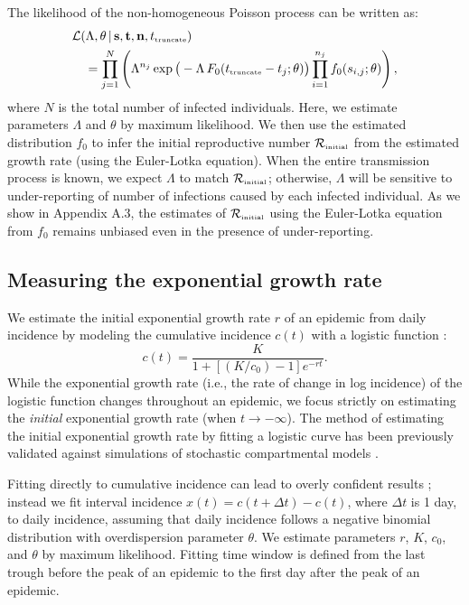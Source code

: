 \documentclass[12pt]{article}
\newcommand{\Rx}[1]{\ensuremath{{\mathcal R}_{#1}}\xspace}
\newcommand{\Rini}{\Rx{\textrm{\tiny initial}}}
\newcommand{\tsub}[2]{#1_{{\textrm{\tiny #2}}}}
\begin{document}
The likelihood of the non-homogeneous Poisson process can be written as:
\begin{equation}\label{eq:nonhomogeneous}
\begin{aligned}
&\mathcal{L}(\Lambda, \theta\,|\, \mathbf{s}, \mathbf{t}, \mathbf{n}, \tsub{t}{truncate})\\
&\quad=\prod_{j=1}^N \left(\Lambda^{n_j} \exp \big(- \Lambda \, F_0(\tsub{t}{truncate} - t_j ;\theta) \big) \prod_{i=1}^{n_j} f_0(s_{i, j}; \theta) \right),
\end{aligned}
\end{equation}
where $N$ is the total number of infected individuals.
Here, we estimate parameters $\Lambda$ and $\theta$ by maximum likelihood.
We then use the estimated distribution $f_0$ to infer the initial reproductive number $\Rini$ from the estimated growth rate (using the Euler-Lotka equation).
When the entire transmission process is known, we expect $\Lambda$ to match $\Rini$;
otherwise, $\Lambda$ will be sensitive to under-reporting of number of infections caused by each infected individual.
As we show in Appendix A.3, the estimates of $\Rini$ using the Euler-Lotka equation from $f_0$ remains unbiased even in the presence of under-reporting.

\subsection{Measuring the exponential growth rate}

We estimate the initial exponential growth rate $r$ of an epidemic from daily incidence by modeling the cumulative incidence $c(t)$ with a logistic function \citep{ma2014estimating}:
\begin{equation}
c(t) = \frac{K}{1 + \left[(K/c_0)-1\right]e^{-rt}}.
\end{equation}
While the exponential growth rate (i.e., the rate of change in log incidence) of the logistic function changes throughout an epidemic,
we focus strictly on estimating the \emph{initial} exponential growth rate (when $t \to -\infty$).
The method of estimating the initial exponential growth rate by fitting a logistic curve has been previously validated against simulations of stochastic compartmental models \citep{ma2014estimating}.

Fitting directly to cumulative incidence can lead to overly confident results \citep{king2015avoidable}; instead we fit interval incidence $x(t) = c(t + \Delta t) - c(t)$, where $\Delta t$ is 1 day, to daily incidence, assuming that daily incidence follows a negative binomial distribution with overdispersion parameter $\theta$.
We estimate parameters $r$, $K$, $c_0$, and $\theta$ by maximum likelihood.
Fitting time window is defined from the last trough before the peak of an epidemic to the first day after the peak of an epidemic.
\end{document}
